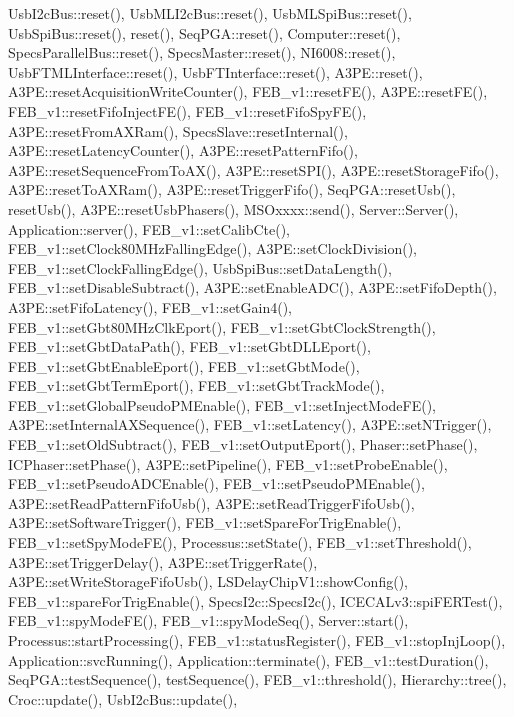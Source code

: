 Usb\+I2c\+Bus\+::reset(), Usb\+M\+L\+I2c\+Bus\+::reset(), Usb\+M\+L\+Spi\+Bus\+::reset(), Usb\+Spi\+Bus\+::reset(), reset(), Seq\+P\+G\+A\+::reset(), Computer\+::reset(), Specs\+Parallel\+Bus\+::reset(), Specs\+Master\+::reset(), N\+I6008\+::reset(), Usb\+F\+T\+M\+L\+Interface\+::reset(), Usb\+F\+T\+Interface\+::reset(), A3\+P\+E\+::reset(), A3\+P\+E\+::reset\+Acquisition\+Write\+Counter(), F\+E\+B\+\_\+v1\+::reset\+F\+E(), A3\+P\+E\+::reset\+F\+E(), F\+E\+B\+\_\+v1\+::reset\+Fifo\+Inject\+F\+E(), F\+E\+B\+\_\+v1\+::reset\+Fifo\+Spy\+F\+E(), A3\+P\+E\+::reset\+From\+A\+X\+Ram(), Specs\+Slave\+::reset\+Internal(), A3\+P\+E\+::reset\+Latency\+Counter(), A3\+P\+E\+::reset\+Pattern\+Fifo(), A3\+P\+E\+::reset\+Sequence\+From\+To\+A\+X(), A3\+P\+E\+::reset\+S\+P\+I(), A3\+P\+E\+::reset\+Storage\+Fifo(), A3\+P\+E\+::reset\+To\+A\+X\+Ram(), A3\+P\+E\+::reset\+Trigger\+Fifo(), Seq\+P\+G\+A\+::reset\+Usb(), reset\+Usb(), A3\+P\+E\+::reset\+Usb\+Phasers(), M\+S\+Oxxxx\+::send(), Server\+::\+Server(), Application\+::server(), F\+E\+B\+\_\+v1\+::set\+Calib\+Cte(), F\+E\+B\+\_\+v1\+::set\+Clock80\+M\+Hz\+Falling\+Edge(), A3\+P\+E\+::set\+Clock\+Division(), F\+E\+B\+\_\+v1\+::set\+Clock\+Falling\+Edge(), Usb\+Spi\+Bus\+::set\+Data\+Length(), F\+E\+B\+\_\+v1\+::set\+Disable\+Subtract(), A3\+P\+E\+::set\+Enable\+A\+D\+C(), A3\+P\+E\+::set\+Fifo\+Depth(), A3\+P\+E\+::set\+Fifo\+Latency(), F\+E\+B\+\_\+v1\+::set\+Gain4(), F\+E\+B\+\_\+v1\+::set\+Gbt80\+M\+Hz\+Clk\+Eport(), F\+E\+B\+\_\+v1\+::set\+Gbt\+Clock\+Strength(), F\+E\+B\+\_\+v1\+::set\+Gbt\+Data\+Path(), F\+E\+B\+\_\+v1\+::set\+Gbt\+D\+L\+L\+Eport(), F\+E\+B\+\_\+v1\+::set\+Gbt\+Enable\+Eport(), F\+E\+B\+\_\+v1\+::set\+Gbt\+Mode(), F\+E\+B\+\_\+v1\+::set\+Gbt\+Term\+Eport(), F\+E\+B\+\_\+v1\+::set\+Gbt\+Track\+Mode(), F\+E\+B\+\_\+v1\+::set\+Global\+Pseudo\+P\+M\+Enable(), F\+E\+B\+\_\+v1\+::set\+Inject\+Mode\+F\+E(), A3\+P\+E\+::set\+Internal\+A\+X\+Sequence(), F\+E\+B\+\_\+v1\+::set\+Latency(), A3\+P\+E\+::set\+N\+Trigger(), F\+E\+B\+\_\+v1\+::set\+Old\+Subtract(), F\+E\+B\+\_\+v1\+::set\+Output\+Eport(), Phaser\+::set\+Phase(), I\+C\+Phaser\+::set\+Phase(), A3\+P\+E\+::set\+Pipeline(), F\+E\+B\+\_\+v1\+::set\+Probe\+Enable(), F\+E\+B\+\_\+v1\+::set\+Pseudo\+A\+D\+C\+Enable(), F\+E\+B\+\_\+v1\+::set\+Pseudo\+P\+M\+Enable(), A3\+P\+E\+::set\+Read\+Pattern\+Fifo\+Usb(), A3\+P\+E\+::set\+Read\+Trigger\+Fifo\+Usb(), A3\+P\+E\+::set\+Software\+Trigger(), F\+E\+B\+\_\+v1\+::set\+Spare\+For\+Trig\+Enable(), F\+E\+B\+\_\+v1\+::set\+Spy\+Mode\+F\+E(), Processus\+::set\+State(), F\+E\+B\+\_\+v1\+::set\+Threshold(), A3\+P\+E\+::set\+Trigger\+Delay(), A3\+P\+E\+::set\+Trigger\+Rate(), A3\+P\+E\+::set\+Write\+Storage\+Fifo\+Usb(), L\+S\+Delay\+Chip\+V1\+::show\+Config(), F\+E\+B\+\_\+v1\+::spare\+For\+Trig\+Enable(), Specs\+I2c\+::\+Specs\+I2c(), I\+C\+E\+C\+A\+Lv3\+::spi\+F\+E\+R\+Test(), F\+E\+B\+\_\+v1\+::spy\+Mode\+F\+E(), F\+E\+B\+\_\+v1\+::spy\+Mode\+Seq(), Server\+::start(), Processus\+::start\+Processing(), F\+E\+B\+\_\+v1\+::status\+Register(), F\+E\+B\+\_\+v1\+::stop\+Inj\+Loop(), Application\+::svc\+Running(), Application\+::terminate(), F\+E\+B\+\_\+v1\+::test\+Duration(), Seq\+P\+G\+A\+::test\+Sequence(), test\+Sequence(), F\+E\+B\+\_\+v1\+::threshold(), Hierarchy\+::tree(), Croc\+::update(), Usb\+I2c\+Bus\+::update(), 